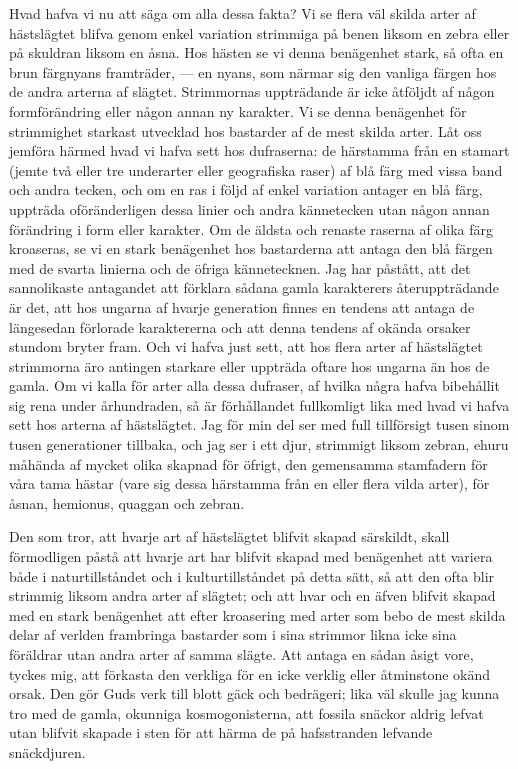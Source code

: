 Hvad hafva vi nu att säga om alla dessa fakta? Vi se flera väl skilda arter af hästslägtet blifva genom enkel variation strimmiga på benen liksom en zebra eller på skuldran liksom en åsna. Hos hästen se vi denna benägenhet stark, så ofta en brun färgnyans framträder, — en nyans, som närmar sig den vanliga färgen hos de andra arterna af slägtet. Strimmornas uppträdande är icke åtföljdt af någon formförändring eller någon annan ny karakter. Vi se denna benägenhet för strimmighet starkast utvecklad hos bastarder af de mest skilda arter. Låt oss jemföra härmed hvad vi hafva sett hos dufraserna: de härstamma från en stamart (jemte två eller tre underarter eller geografiska raser) af blå färg med vissa band och andra tecken, och om en ras i följd af enkel variation antager en blå färg, uppträda oföränderligen dessa linier och andra kännetecken utan någon annan förändring i form eller karakter. Om de äldsta och renaste raserna af olika färg kroaseras, se vi en stark benägenhet hos bastarderna att antaga den blå färgen med de svarta linierna och de öfriga kännetecknen. Jag har påstått, att det sannolikaste antagandet att förklara sådana gamla karakterers återuppträdande är det, att hos ungarna af hvarje generation finnes en tendens att antaga de längesedan förlorade karaktererna och att denna tendens af okända orsaker stundom bryter fram. Och vi hafva just sett, att hos flera arter af hästslägtet strimmorna äro antingen starkare eller uppträda oftare hos ungarna än hos de gamla. Om vi kalla för arter alla dessa dufraser, af hvilka några hafva bibehållit sig rena under århundraden, så är förhållandet fullkomligt lika med hvad vi hafva sett hos arterna af hästslägtet. Jag för min del ser med full tillförsigt tusen sinom tusen generationer tillbaka, och jag ser i ett djur, strimmigt liksom zebran, ehuru måhända af mycket olika skapnad för öfrigt, den gemensamma stamfadern för våra tama hästar (vare sig dessa härstamma från en eller flera vilda arter), för åsnan, hemionus, quaggan och zebran.

Den som tror, att hvarje art af hästslägtet blifvit skapad särskildt, skall förmodligen påstå att hvarje art har blifvit skapad med benägenhet att variera både i naturtillståndet och i kulturtillståndet på detta sätt, så att den ofta blir strimmig liksom andra arter af slägtet; och att hvar och en äfven blifvit skapad med en stark benägenhet att efter kroasering med arter som bebo de mest skilda delar af verlden frambringa bastarder som i sina strimmor likna icke sina föräldrar utan andra arter af samma slägte. Att antaga en sådan åsigt vore, tyckes mig, att förkasta den verkliga för en icke verklig eller åtminstone okänd orsak. Den gör Guds verk till blott gäck och bedrägeri; lika väl skulle jag kunna tro med de gamla, okunniga kosmogonisterna, att fossila snäckor aldrig lefvat utan blifvit skapade i sten för att härma de på hafsstranden lefvande snäckdjuren.



